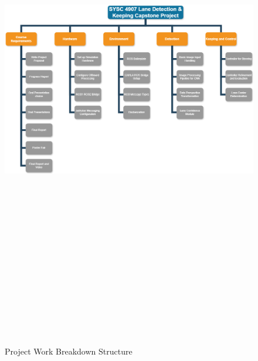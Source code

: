 \documentclass[titlepage,draft]{article}
\begin{document}
\begin{figure}[H]
	\centering
	\includegraphics[angle=90,height=9in]{wbs}
	\caption{Project Work Breakdown Structure}
	\label{fig:wbs}
\end{figure}
\end{document}
